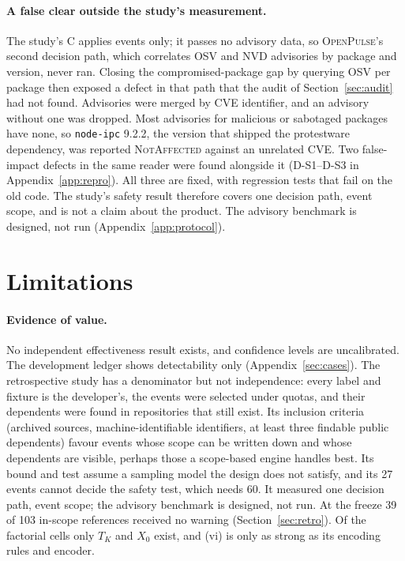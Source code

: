 \documentclass[11pt,a4paper]{article}
\newcommand{\op}{\textsc{OpenPulse}}
\newcommand{\code}[1]{\texttt{#1}}
\begin{document}
\paragraph{A false clear outside the study's measurement.} The study's
C applies events only; it passes no advisory data, so \op{}'s second
decision path, which correlates OSV and NVD advisories by package and
version, never ran. Closing the compromised-package gap by querying
OSV per package then exposed a defect in that path that the audit of
Section~\ref{sec:audit} had not found. Advisories were merged by CVE
identifier, and an advisory without one was dropped. Most advisories
for malicious or sabotaged packages have none, so \code{node-ipc}
9.2.2, the version that shipped the protestware dependency, was
reported \textsc{NotAffected} against an unrelated CVE. Two
false-impact defects in the same reader were found alongside it
(D-S1--D-S3 in Appendix~\ref{app:repro}). All three are fixed, with
regression tests that fail on the old code. The study's safety result therefore covers one
decision path, event scope, and is not a claim about the product. The
advisory benchmark is designed, not run (Appendix~\ref{app:protocol}).

\section{Limitations}
\label{sec:limits}

\paragraph{Evidence of value.} No independent effectiveness result
exists, and confidence levels are uncalibrated. The development ledger
shows detectability only (Appendix~\ref{sec:cases}). The retrospective
study has a denominator but not independence: every label and fixture
is the developer's, the events were selected under quotas, and their
dependents were found in repositories that still exist. Its inclusion
criteria (archived sources, machine-identifiable identifiers, at least
three findable public dependents) favour events whose scope can be
written down and whose dependents are visible, perhaps those a
scope-based engine handles best. Its bound and test assume a sampling
model the design does not satisfy, and its 27 events cannot decide the
safety test, which needs 60. It measured one decision path, event
scope; the advisory benchmark is designed, not run. At the freeze 39 of
103 in-scope references received no warning (Section~\ref{sec:retro}).
Of the factorial cells only $T_K$ and $X_0$ exist, and (vi) is only as
strong as its encoding rules and encoder.
\end{document}
